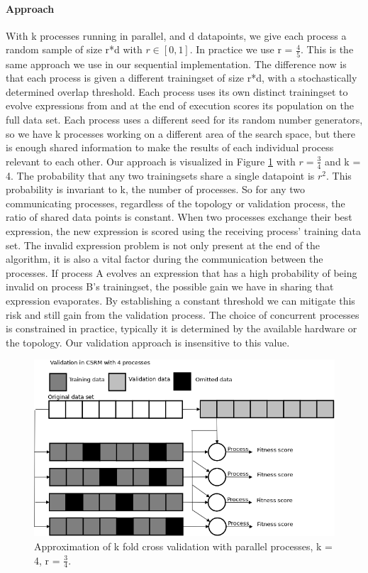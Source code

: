 \paragraph{Approach}
With k processes running in parallel, and d datapoints, we give each process a random sample of size r*d with $r \in [0,1]$. In practice we use r = $\frac{4}{5}$. This is the same approach we use in our sequential implementation. The difference now is that each process is given a different trainingset of size r*d, with a stochastically determined overlap threshold. Each process uses its own distinct trainingset to evolve expressions from and at the end of execution scores its population on the full data set. Each process uses a different seed for its random number generators, so we have k processes working on a different area of the search space, but there is enough shared information to make the results of each individual process relevant to each other. Our approach is visualized in Figure \ref{fig:csrmkfold} with $r = \frac{3}{4}$ and k = 4.
The probability that any two trainingsets share a single datapoint is $r^2$. This probability is invariant to k, the number of processes. So for any two communicating processes, regardless of the topology or validation process, the ratio of shared data points is constant. When two processes exchange their best expression, the new expression is scored using the receiving process' training data set. The invalid expression problem is not only present at the end of the algorithm, it is also a vital factor during the communication between the processes. If process A evolves an expression that has a high probability of being invalid on process B's trainingset, the possible gain we have in sharing that expression evaporates. By establishing a constant threshold we can mitigate this risk and still gain from the validation process.
The choice of concurrent processes is constrained in practice, typically it is determined by the available hardware or the topology. Our validation approach is insensitive to this value. 

\begin{figure}
    \centering
    \includegraphics[width=\textwidth,height=\textheight,keepaspectratio]{figures/validationcsrm.png}
    \caption{Approximation of k fold cross validation with parallel processes, k = 4,  r = $\frac{3}{4}$.}
    \label{fig:csrmkfold}
\end{figure}


